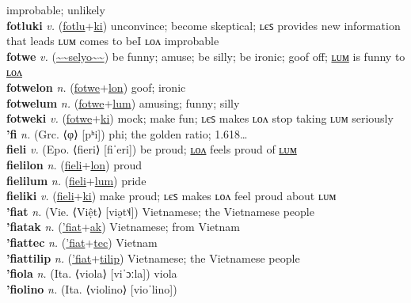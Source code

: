 improbable; unlikely \label{fotlulum} \\
\textbf{fotluki} \textit{v.} (\hyperref[fotlu]{fotlu}+\hyperref[ki]{ki})
unconvince; become skeptical; ʟєꜱ provides new information that leads ʟᴜᴍ comes to beI ʟᴏᴧ improbable \label{fotluki} \\
\textbf{fotwe} \textit{v.} (\hyperref[selyo]{\~{}\~{}selyo\~{}\~{}})
be funny; amuse; be silly; be ironic; goof off; \hyperref[fotwelum]{ʟᴜᴍ} is funny to \hyperref[fotwelon]{ʟᴏᴧ} \label{fotwe} \\
\textbf{fotwelon} \textit{n.} (\hyperref[fotwe]{fotwe}+\hyperref[lon]{lon})
goof; ironic \label{fotwelon} \\
\textbf{fotwelum} \textit{n.} (\hyperref[fotwe]{fotwe}+\hyperref[lum]{lum})
amusing; funny; silly \label{fotwelum} \\
\textbf{fotweki} \textit{v.} (\hyperref[fotwe]{fotwe}+\hyperref[ki]{ki})
mock; make fun; ʟєꜱ makes ʟᴏᴧ stop taking ʟᴜᴍ seriously \label{fotweki} \\
\textbf{'fi} \textit{n.} (Grc. ⟨φ⟩ [pʰi])
phi; the golden ratio; 1.618… \label{'fi} \\
\textbf{fieli} \textit{v.} (Epo. ⟨fieri⟩ [fiˈeri])
be proud; \hyperref[fielilon]{ʟᴏᴧ} feels proud of \hyperref[fielilum]{ʟᴜᴍ} \label{fieli} \\
\textbf{fielilon} \textit{n.} (\hyperref[fieli]{fieli}+\hyperref[lon]{lon})
proud \label{fielilon} \\
\textbf{fielilum} \textit{n.} (\hyperref[fieli]{fieli}+\hyperref[lum]{lum})
pride \label{fielilum} \\
\textbf{fieliki} \textit{v.} (\hyperref[fieli]{fieli}+\hyperref[ki]{ki})
make proud; ʟєꜱ makes ʟᴏᴧ feel proud about ʟᴜᴍ \label{fieliki} \\
\textbf{'fiat} \textit{n.} (Vie. ⟨Việt⟩ [viə̯t˦˨])
Vietnamese; the Vietnamese people \label{'fiat} \\
\textbf{'fiatak} \textit{n.} (\hyperref['fiat]{'fiat}+\hyperref[ak]{ak})
Vietnamese; from Vietnam \label{'fiatak} \\
\textbf{'fiattec} \textit{n.} (\hyperref['fiat]{'fiat}+\hyperref[tec]{tec})
Vietnam \label{'fiattec} \\
\textbf{'fiattilip} \textit{n.} (\hyperref['fiat]{'fiat}+\hyperref[tilip]{tilip})
Vietnamese; the Vietnamese people \label{'fiattilip} \\
\textbf{'fiola} \textit{n.} (Ita. ⟨viola⟩ [viˈɔːla])
viola \label{'fiola} \\
\textbf{'fiolino} \textit{n.} (Ita. ⟨violino⟩ [vioˈlino])
